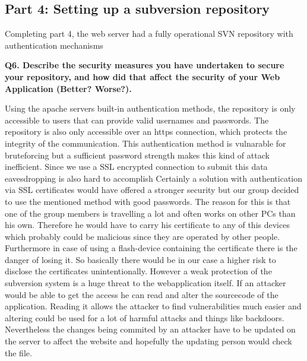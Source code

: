 \subsection {Part 4: Setting up a subversion repository}
Completing part 4, the web server had a fully operational SVN repository with authentication mechanisms
\newline

\noindent
{\bf Q6. Describe the security measures you have undertaken to secure your
repository, and how did that affect the security of your Web Application
(Better? Worse?).}
\newline

\noindent
Using the apache servers built-in authentication methods, the repository is only accessible to users that can provide valid usernames and passwords. The repository is also only accessible over an https connection, which protects the integrity of the communication. 
This authentication method is vulnarable for bruteforcing but a sufficient password strength makes this kind of attack inefficient. Since we use a SSL encrypted connection to submit this data eavesdropping is also hard to accomplish
\newline
Certainly a solution with authentication via SSL certificates would have offered a stronger security but our group decided to use the mentioned method with good passwords.
The reason for this is that one of the group members is travelling a lot and often works on other PCs than his own. Therefore he would have to carry his certificate to any of this devices which probably could be malicious since they are operated by other people. Furthermore in case of using a flash-device containing the certificate there is the danger of losing it.
So basically there would be in our case a higher risk to disclose the certificates unintentionally.
However a weak protection of the subversion system is a huge threat to the webapplication itself. If an attacker would be able to get the access he can read and alter the sourcecode of the application. Reading it allows the attacker to find vulnerabilities much easier and altering could be used for a lot of harmful attacks and things like backdoors. Nevertheless the changes being commited by an attacker have to be updated on the server to affect the website and hopefully the updating person would check the file.


